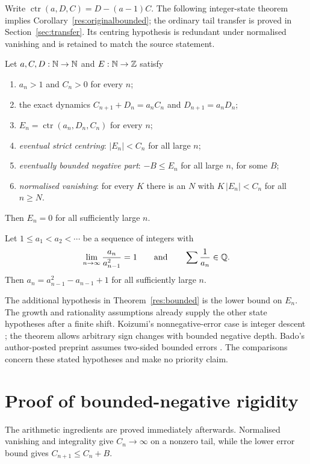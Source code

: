 \documentclass[11pt]{article}
\newcommand{\ctr}{\operatorname{ctr}}
\begin{document}
\begin{samepage}
Write $\ctr(a,D,C)=D-(a-1)C$. The following integer-state theorem
implies Corollary~\ref{res:originalbounded}; the ordinary tail transfer is
proved in Section~\ref{sec:transfer}. Its centring hypothesis is redundant
under normalised vanishing and is retained to match the source statement.

\begin{theorem}\label{res:bounded}
Let $a,C,D:\mathbb{N}\to\mathbb{N}$ and $E:\mathbb{N}\to\mathbb{Z}$ satisfy
\begin{enumerate}
\item $a_n>1$ and $C_n>0$ for every $n$;
\item the exact dynamics $C_{n+1}+D_n=a_nC_n$ and $D_{n+1}=a_nD_n$;
\item $E_n=\ctr(a_n,D_n,C_n)$ for every $n$;
\item \emph{eventual strict centring}: $|E_n|<C_n$ for all large $n$;
\item \emph{eventually bounded negative part}: $-B\le E_n$ for all large $n$,
for some $B$;
\item \emph{normalised vanishing}: for every $K$ there is an $N$ with
$K\,|E_n|<C_n$ for all $n\ge N$.
\end{enumerate}
Then $E_n=0$ for all sufficiently large $n$.
\end{theorem}
\end{samepage}

\begin{problem}[Erd\H{o}s \#243]\label{res:problem}
Let $1\le a_1<a_2<\cdots$ be a sequence of integers with
\[
 \lim_{n\to\infty}\frac{a_n}{a_{n-1}^{2}}=1
 \qquad\text{and}\qquad
 \sum\frac{1}{a_n}\in\mathbb{Q} .
\]
Then $a_n=a_{n-1}^{2}-a_{n-1}+1$ for all sufficiently large $n$.
\end{problem}

The additional hypothesis in Theorem~\ref{res:bounded} is the lower bound
on $E_n$. The growth and rationality assumptions already supply the other
state hypotheses after a finite shift. Koizumi's nonnegative-error case is
integer descent \cite[Proposition~1(2)]{koizumi2025}; the theorem allows
arbitrary sign changes with bounded negative depth. Bado's author-posted
preprint assumes two-sided bounded errors \cite[Theorem~5.1]{bado2026}.
The comparisons concern these stated hypotheses and make no priority claim.

\section{Proof of bounded-negative rigidity}\label{sec:bounded}
The arithmetic ingredients are proved immediately afterwards. Normalised
vanishing and integrality give $C_n\to\infty$ on a nonzero tail, while the
lower error bound gives $C_{n+1}\le C_n+B$.
\end{document}
